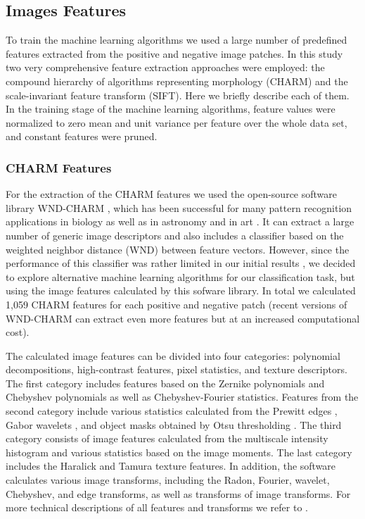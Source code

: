 \subsection{Images Features}
\label{subsec:imageFeaturesExtraction}

To train the machine learning algorithms we used a large number of predefined features extracted from the positive and negative image patches. In this study two very comprehensive feature extraction approaches were employed: the compound hierarchy of algorithms representing morphology (CHARM) and the scale-invariant feature transform (SIFT). Here we briefly describe each of them. In the training stage of the machine learning algorithms, feature values were normalized to zero mean and unit variance per feature over the whole data set, and constant features were pruned.

\subsubsection{CHARM Features}
\label{subsubsec:wnd-chrm}

For the extraction of the CHARM features we used the open-source software library WND-CHARM \cite{shamir2008wndchrm, orlov2008wnd}, which has been successful for many pattern recognition applications in biology \cite{shamir2010pattern, uhlmann2016cp} as well as in astronomy \cite{shamir2012automatic, kuminski2014combining} and in art \cite{shamir2012computer}. It can extract a large number of generic image descriptors and also includes a classifier based on the weighted neighbor distance (WND) between feature vectors. However, since the performance of this classifier was rather limited in our initial results \cite{mata2016automatic}, we decided to explore alternative machine learning algorithms for our classification task, but using the image features calculated by this sofware library. In total we calculated 1,059 CHARM features for each positive and negative patch (recent versions of WND-CHARM can extract even more features but at an increased computational cost).

The calculated image features can be divided into four categories: polynomial decompositions, high-contrast features, pixel statistics, and texture descriptors. The first category includes features based on the Zernike polynomials and Chebyshev polynomials \cite{gradshteyn2014table} as well as Chebyshev-Fourier statistics. Features from the second category include various statistics calculated from the Prewitt edges \cite{prewitt1970object}, Gabor wavelets \cite{gabor1946theory}, and object masks obtained by Otsu thresholding \cite{otsu1979threshold}. The third category consists of image features calculated from the multiscale intensity histogram \cite{hadjidemetriou2001spatial} and various statistics based on the image moments. The last category includes the Haralick \cite{haralick1973textural} and Tamura \cite{tamura1978textural} texture features. In addition, the software calculates various image transforms, including the Radon, Fourier, wavelet, Chebyshev, and edge transforms, as well as transforms of image transforms. For more technical descriptions of all features and transforms we refer to \cite{orlov2008wnd}.

